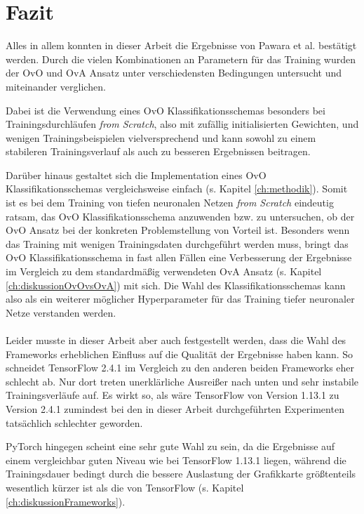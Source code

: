 \chapter{Fazit}
\label{ch:fazit}
Alles in allem konnten in dieser Arbeit die Ergebnisse von Pawara et al. \cite{pawaraPaper} bestätigt werden.
Durch die vielen Kombinationen an Parametern für das Training wurden der OvO und OvA Ansatz unter verschiedensten Bedingungen untersucht und miteinander verglichen.

Dabei ist die Verwendung eines OvO Klassifikationsschemas besonders bei Trainingsdurchläufen \textit{from Scratch}, also mit zufällig initialisierten Gewichten, und wenigen Trainingsbeispielen vielversprechend und kann sowohl zu einem stabileren Trainingsverlauf als auch zu besseren Ergebnissen beitragen.

Darüber hinaus gestaltet sich die Implementation eines OvO Klassifikationsschemas vergleichsweise einfach (s. Kapitel \ref{ch:methodik}). Somit ist es bei dem Training von tiefen neuronalen Netzen \textit{from Scratch} eindeutig ratsam, das OvO Klassifikationsschema anzuwenden bzw. zu untersuchen, ob der OvO Ansatz bei der konkreten Problemstellung von Vorteil ist. Besonders wenn das Training mit wenigen Trainingsdaten durchgeführt werden muss, bringt das OvO Klassifikationsschema in fast allen Fällen eine Verbesserung der Ergebnisse im Vergleich zu dem standardmäßig verwendeten OvA Ansatz (s. Kapitel \ref{ch:diskussionOvOvsOvA}) mit sich. Die Wahl des Klassifikationsschemas kann also als ein weiterer möglicher Hyperparameter für das Training tiefer neuronaler Netze verstanden werden.\\\\

Leider musste in dieser Arbeit aber auch festgestellt werden, dass die Wahl des Frameworks erheblichen Einfluss auf die Qualität der Ergebnisse haben kann. So schneidet TensorFlow 2.4.1 \cite{tensorflow} im Vergleich zu den anderen beiden Frameworks eher schlecht ab. Nur dort treten unerklärliche Ausreißer nach unten und sehr instabile Trainingsverläufe auf. Es wirkt so, als wäre TensorFlow \cite{tensorflow} von Version 1.13.1 zu Version 2.4.1 zumindest bei den in dieser Arbeit durchgeführten Experimenten tatsächlich schlechter geworden.

PyTorch \cite{pytorch} hingegen scheint eine sehr gute Wahl zu sein, da die Ergebnisse auf einem vergleichbar guten Niveau wie bei TensorFlow 1.13.1 \cite{tensorflow} liegen, während die Trainingsdauer bedingt durch die bessere Auslastung der Grafikkarte größtenteils wesentlich kürzer ist als die von TensorFlow \cite{tensorflow} (s. Kapitel \ref{ch:diskussionFrameworks}).\\\\

